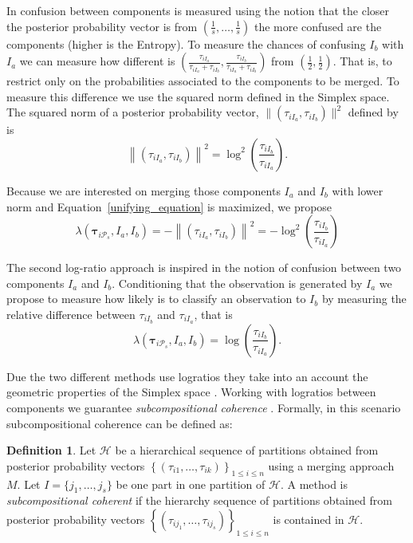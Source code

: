 \documentclass[submit]{smj}
\theoremstyle{definition}
\newtheorem{defn}{Definition}[section]
\newcommand{\m}[1]{\boldsymbol{#1}}
\begin{document}
In \cite{baudry2010combining} confusion between components is measured using the notion that the closer the posterior probability vector is from $(\frac{1}{s}, \dots, \frac{1}{s})$ the more confused are the components (higher is the Entropy). To measure the chances of confusing $I_b$ with $I_a$ we can measure how different is $(\frac{\tau_{i I_a}}{\tau_{i I_a} +\tau_{i I_b}}, \frac{\tau_{i I_b}}{\tau_{i I_a} + \tau_{i I_b}})$ from $(\frac{1}{2}, \frac{1}{2})$. That is, to restrict only on the probabilities associated to the components to be merged. To measure this difference we use the squared norm defined in the Simplex space. The squared norm of a posterior probability vector, $\| (\tau_{iI_a}, \tau_{iI_b}) \|^2$  defined by \cite{aitchison2002simplicial} is 
\[
\left\| (\tau_{iI_a}, \tau_{iI_b}) \right\|^2 = \log^2 \left(\frac{ \tau_{iI_b} }{ \tau_{iI_a} }\right).
\]

Because we are interested on merging those components $I_a$ and $I_b$ with lower norm and Equation~\ref{unifying_equation} is maximized, we propose
\[
\lambda(\m\tau_{i \mathcal{P}_s},  I_a,  I_b) = -\left\| (\tau_{iI_a}, \tau_{iI_b}) \right\|^2 = -\log^2 \left(\frac{ \tau_{iI_b} }{ \tau_{iI_a} }\right)
\]


The second log-ratio approach is inspired in the notion of confusion \citep{hennig2010methods} between two components $I_a$ and $I_b$. Conditioning that the observation is generated by $I_a$ we propose to measure how likely is to classify an observation to $I_b$ by measuring the relative difference between $\tau_{i I_b}$ and $\tau_{i I_a}$, that is 
\[
\lambda(\m\tau_{i \mathcal{P}_s},  I_a,  I_b) = \log \left(\frac{ \tau_{iI_b} }{ \tau_{iI_a} }\right).
\]


Due the two different methods use logratios they take into an account the geometric properties of the Simplex space \citep{aitchison2002simplicial}.  Working with logratios between components we guarantee \emph{subcompositional coherence}  \citep{aitchison1986statistical}. Formally, in this scenario subcompositional coherence can be defined as:

\begin{defn}
Let $\mathcal{H}$ be a hierarchical sequence of partitions obtained from posterior probability vectors $\left\{ \left(\tau_{i1}, \dots, \tau_{ik} \right)\right\}_{1\leq i \leq n}$ using a merging approach $M$. Let $I = \{j_1, \dots, j_s\}$ be one part in one partition of $\mathcal{H}$. A method is \emph{subcompositional coherent} if the hierarchy sequence of partitions obtained  from posterior probability vectors $\left\{ \left(\tau_{ij_1}, \dots, \tau_{ij_s} \right)\right\}_{1\leq i \leq n}$ is contained in $\mathcal{H}$.
\end{defn}
\end{document}
